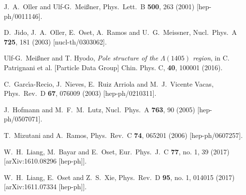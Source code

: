 \documentclass{PoS}
\begin{document}
\begin{thebibliography}{99}
 J.~A.~Oller and Ulf-G.~Mei{\ss}ner,
  Phys.\ Lett.\ B {\bf 500}, 263 (2001)
  [hep-ph/0011146].
  
D.~Jido, J.~A.~Oller, E.~Oset, A.~Ramos and U.~G.~Meissner,
  Nucl.\ Phys.\ A {\bf 725}, 181 (2003)
  [nucl-th/0303062].

Ulf-G.~Mei{\ss}ner and T. Hyodo, {\it Pole structure of the $\Lambda(1405)$ region}, in
C. Patrignani et al. [Particle Data Group] Chin. Phys. C, {\bf 40}, 100001 (2016).

 C.~Garc\'{\i}a-Recio, J.~Nieves, E.~Ruiz Arriola and M.~J.~Vicente Vacas,
  Phys.\ Rev.\ D {\bf 67}, 076009 (2003)
  [hep-ph/0210311].
  
J.~Hofmann and M.~F.~M.~Lutz,
  Nucl.\ Phys.\ A {\bf 763}, 90 (2005)
  [hep-ph/0507071].

T.~Mizutani and A.~Ramos,
  Phys.\ Rev.\ C {\bf 74}, 065201 (2006)
  [hep-ph/0607257].
 
W.~H.~Liang, M.~Bayar and E.~Oset,
  Eur.\ Phys.\ J.\ C {\bf 77}, no. 1, 39 (2017)
  [arXiv:1610.08296 [hep-ph]].
  
 
 W.~H.~Liang, E.~Oset and Z.~S.~Xie,
  Phys.\ Rev.\ D {\bf 95}, no. 1, 014015 (2017)
  [arXiv:1611.07334 [hep-ph]].
  

\end{thebibliography}
\end{document}
